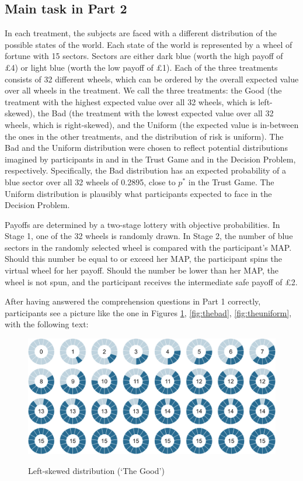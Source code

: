 \subsection{Main task in Part 2}
In each treatment, the subjects are faced with a different distribution of the possible states of the world.
Each state of the world is represented by a wheel of fortune with 15 sectors.
Sectors are either dark blue (worth the high payoff of \pounds4) or light blue (worth the low payoff of \pounds1).
Each of the three treatments consists of 32 different wheels, which can be ordered by the overall expected value over all wheels in the treatment.
We call the three treatments: the Good (the treatment with the highest expected value over all 32 wheels, which is left-skewed), the Bad (the treatment with the lowest expected value over all 32 wheels, which is right-skewed), and the Uniform (the expected value is in-between the ones in the other treatments, and the distribution of risk is uniform).
The Bad and the Uniform distribution were chosen to reflect potential distributions imagined by participants in \cite{Bohnet2004} and \cite{Bohnet2008} in the Trust Game and in the Decision Problem, respectively.
Specifically, the Bad distribution has an expected probability of a blue sector over all 32 wheels of 0.2895, close to $p^*$ in the Trust Game.
The Uniform distribution is plausibly what participants expected to face in the Decision Problem.

Payoffs are determined by a two-stage lottery with objective probabilities.
In Stage 1, one of the 32 wheels is randomly drawn.
In Stage 2, the number of blue sectors in the randomly selected wheel is compared with the participant's MAP.
Should this number be equal to or exceed her MAP, the participant spins the virtual wheel for her payoff.
Should the number be lower than her MAP, the wheel is not spun, and the participant receives the intermediate safe payoff of \pounds2.

After having answered the comprehension questions in Part 1 correctly, participants see a picture like the one in Figures \ref{fig:thegood}, \ref{fig:thebad}, \ref{fig:theuniform}, with the following text:

\begin{figure}[h!]
  \centering
 {\includegraphics[width=0.95\linewidth]{Left_15.png}}
  \caption{Left-skewed distribution (`The Good')}
  \label{fig:thegood}
\end{figure}


